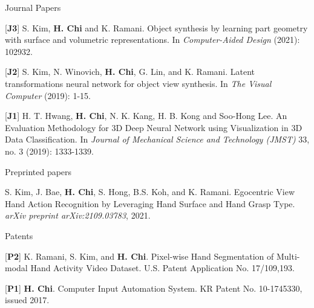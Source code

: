 \begin{cventries}

\cvpub
{Journal Papers} %
{ %
\begin{cvitems}
\item {[\textbf{J3}] S. Kim, \textbf{H. Chi} and K. Ramani. Object synthesis by learning part geometry with surface and volumetric representations. In \textit{Computer-Aided Design} (2021): 102932.}
\item {[\textbf{J2}] S. Kim, N. Winovich, \textbf{H. Chi}, G. Lin, and K. Ramani. Latent transformations neural network for object view synthesis. In \textit{The Visual Computer} (2019): 1-15.}
\item {[\textbf{J1}] H. T. Hwang, \textbf{H. Chi}, N. K. Kang, H. B. Kong and Soo-Hong Lee. An Evaluation Methodology for 3D Deep Neural Network using Visualization in 3D Data Classification. In \textit{Journal of Mechanical Science and Technology (JMST)} 33, no. 3 (2019): 1333-1339.}
\end{cvitems}
}

\cvpub
{Preprinted papers} %
{
\begin{cvitems}
\item {S. Kim, J. Bae, \textbf{H. Chi}, S. Hong, B.S. Koh, and K. Ramani. Egocentric View Hand Action Recognition by Leveraging Hand Surface and Hand Grasp Type. \textit{arXiv preprint arXiv:2109.03783}, 2021. }
\end{cvitems}
}

\cvpub
{Patents}{
\begin{cvitems}
\item {[\textbf{P2}] K. Ramani, S. Kim, and \textbf{H. Chi}. Pixel-wise Hand Segmentation of Multi-modal Hand Activity Video Dataset. U.S. Patent Application No. 17/109,193.}
\item {[\textbf{P1}] \textbf{H. Chi}. Computer Input Automation System. KR Patent No. 10-1745330, issued 2017.}
\end{cvitems}
}



\end{cventries}
